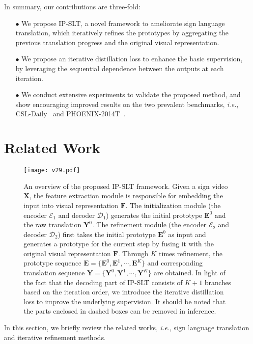 \documentclass[10pt,twocolumn,letterpaper]{article}
\begin{document}
In summary, our contributions are three-fold:
\begin{itemize}
\item[$\bullet$] We propose IP-SLT, a novel framework to ameliorate sign language translation, which iteratively refines the prototypes by aggregating the previous translation progress and the original visual representation.
\end{itemize}
\begin{itemize}
\item[$\bullet$] We propose an iterative distillation loss to enhance the basic supervision, by leveraging the sequential dependence between the outputs at each iteration.
\end{itemize}
\begin{itemize}
\item[$\bullet$] 
We conduct extensive experiments to validate the proposed method, and show encouraging improved results on the two prevalent benchmarks, \emph{i.e.}, CSL-Daily~\cite{zhou2021improving} and PHOENIX-2014T~\cite{camgoz2018neural}.
\end{itemize}

\section{Related Work}

\begin{figure*}
\centering
\texttt{[image: v29.pdf]}
\caption{An overview of the proposed IP-SLT framework. Given a sign video $\bm{X}$, the feature extraction module is responsible for embedding the input into visual representation $\bm{F}$. The initialization module (the encoder $\mathcal{E}_1$ and decoder $\mathcal{D}_1$) generates the initial prototype $\bm{E}^0$ and the raw translation $\bm{Y}^0$. The refinement module (the encoder $\mathcal{E}_2$ and decoder $\mathcal{D}_2$) first takes the initial prototype $\bm{E}^0$ as input and generates a prototype for the current step by fusing it with the original visual representation $\bm{F}$. Through $K$ times refinement, the prototype sequence $\bm{E}=\{\bm{E}^0,\bm{E}^1,\cdots,\bm{E}^K\}$ and corresponding translation sequence $\bm{Y}=\{\bm{Y}^0,\bm{Y}^1,\cdots,\bm{Y}^K\}$ are obtained.
In light of the fact that the decoding part of IP-SLT consists of $K+1$ branches based on the iteration order, we introduce the iterative distillation loss to improve the underlying supervision. It should be noted that the parts enclosed in dashed boxes can be removed in inference.
}
\label{fig2}
\end{figure*}
In this section, we briefly review the related works, \emph{i.e.}, sign language translation and iterative refinement methods.
\end{document}
